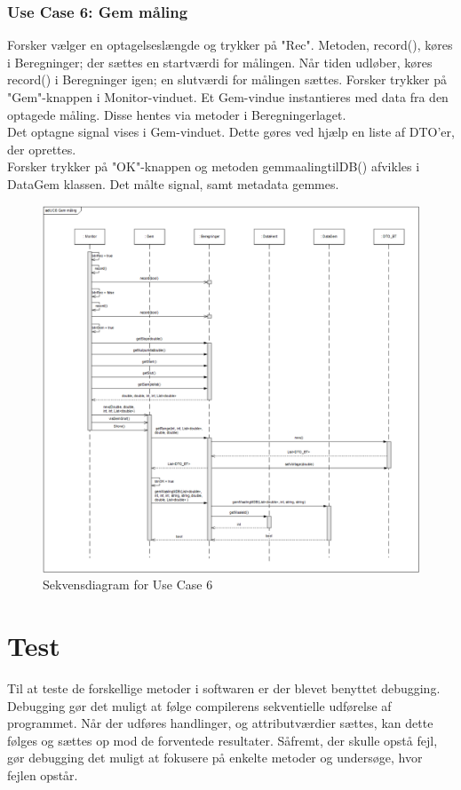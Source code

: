 \subsubsection{Use Case 6: Gem måling}
Forsker vælger en optagelseslængde og trykker på "Rec". Metoden, record(), køres i Beregninger; der sættes en startværdi for målingen.
Når tiden udløber, køres record() i Beregninger igen; en slutværdi for målingen sættes.
Forsker trykker på "Gem"\--knappen i Monitor-vinduet. Et Gem-vindue instantieres med data fra den optagede måling. Disse hentes via metoder i Beregningerlaget.\\
Det optagne signal vises i Gem-vinduet. Dette gøres ved hjælp en liste af DTO'er, der oprettes.\\

Forsker trykker på "OK"\--knappen
og metoden gemmaalingtilDB() afvikles i DataGem klassen. Det målte signal, samt metadata gemmes. 

\begin{figure}[H]
	\centering
	\includegraphics[width=1\textwidth]{Figurer/UC6_SD_SW}
	\caption{Sekvensdiagram for Use Case 6}
\end{figure}

\section{Test}
Til at teste de forskellige metoder i softwaren er der blevet benyttet debugging. Debugging gør det muligt at følge compilerens sekventielle udførelse af programmet. Når der udføres handlinger, og attributværdier sættes, kan dette følges og sættes op mod de forventede resultater. Såfremt, der skulle opstå fejl, gør debugging det muligt at fokusere på enkelte metoder og undersøge, hvor fejlen opstår.

